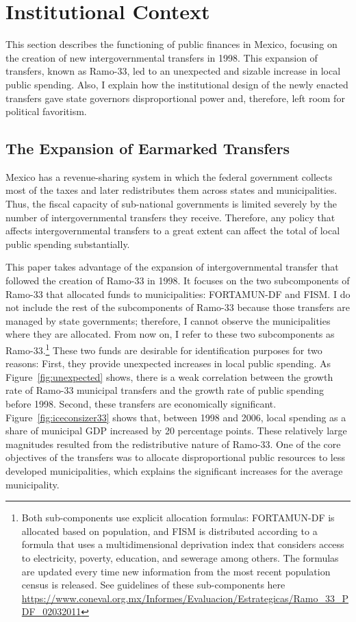 \documentclass[dv_diss_main.tex]{subfiles}
\begin{document}
\section{Institutional Context}\label{InstCont}

This section describes the functioning of public finances in Mexico, focusing on the creation of new intergovernmental transfers in 1998. This expansion of transfers, known as Ramo-33, led to an unexpected and sizable increase in local public spending. Also, I explain how the institutional design of the newly enacted transfers gave state governors disproportional power and, therefore, left room for political favoritism.  

\subsection{The Expansion of Earmarked Transfers}

Mexico has a revenue-sharing system in which the federal government collects most of the taxes and later redistributes them across states and municipalities.
Thus, the fiscal capacity of sub-national governments is limited severely by the number of intergovernmental transfers they receive. Therefore, any policy that affects intergovernmental transfers to a great extent can affect the total of local public spending substantially. 

This paper takes advantage of the expansion of intergovernmental transfer that followed the creation of Ramo-33 in 1998. It focuses on the two subcomponents of Ramo-33 that allocated funds to municipalities: FORTAMUN-DF and FISM. I do not include the rest of the subcomponents of Ramo-33 because those transfers are managed by state governments; therefore, I cannot observe the municipalities where they are allocated.  From now on, I refer to these two subcomponents as Ramo-33.\footnote{Both sub-components use explicit allocation formulas: FORTAMUN-DF is allocated based on population, and FISM is distributed according to a formula that uses a multidimensional deprivation index that considers access to electricity, poverty, education, and sewerage among others. The formulas are updated every time new information from the most recent population census is released.  See guidelines of these sub-components here  \url{https://www.coneval.org.mx/Informes/Evaluacion/Estrategicas/Ramo_33_PDF_02032011}}
These two funds are desirable for identification purposes for two reasons:
First, they provide unexpected increases in local public spending. As Figure~\ref{fig:unexpected}  shows, there is a weak correlation between the growth rate of Ramo-33 municipal transfers and the growth rate of public spending before 1998. Second, these transfers are economically significant. Figure~\ref{fig:iceconsizer33}  shows that, between 1998 and 2006, local spending as a share of municipal GDP increased by 20 percentage points. 
These relatively large magnitudes resulted from the redistributive nature of Ramo-33. One of the core objectives of the transfers was to allocate disproportional public resources to less developed municipalities, which explains the significant increases for the average municipality. 
\end{document}
